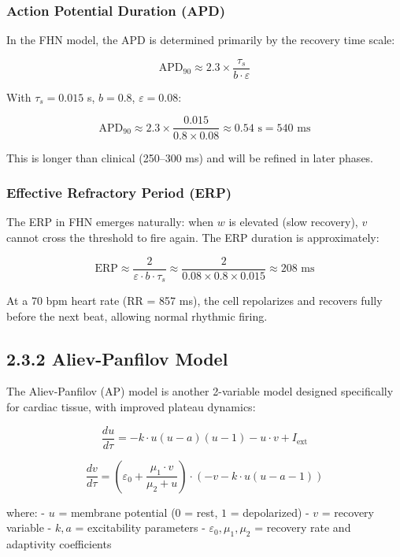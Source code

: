 \documentclass[12pt,oneside,a4paper]{book}
\begin{document}
\subsubsection{Action Potential Duration (APD)}

In the FHN model, the APD is determined primarily by the recovery time scale:

$$\text{APD}_{90} \approx 2.3 \times \frac{\tau_s}{b \cdot \varepsilon}$$

With $\tau_s = 0.015$ s, $b = 0.8$, $\varepsilon = 0.08$:

$$\text{APD}_{90} \approx 2.3 \times \frac{0.015}{0.8 \times 0.08} \approx 0.54 \text{ s} = 540 \text{ ms}$$

This is longer than clinical (250--300 ms) and will be refined in later phases.

\subsubsection{Effective Refractory Period (ERP)}

The ERP in FHN emerges naturally: when $w$ is elevated (slow recovery), $v$ cannot cross the threshold to fire again. The ERP duration is approximately:

$$\text{ERP} \approx \frac{2}{\varepsilon \cdot b \cdot \tau_s} \approx \frac{2}{0.08 \times 0.8 \times 0.015} \approx 208 \text{ ms}$$

At a 70 bpm heart rate (RR = 857 ms), the cell repolarizes and recovers fully before the next beat, allowing normal rhythmic firing.

\subsection{2.3.2 Aliev-Panfilov Model}

The Aliev-Panfilov (AP) model is another 2-variable model designed specifically for cardiac tissue, with improved plateau dynamics:

\begin{equation}
\frac{du}{d\tau} = -k \cdot u(u - a)(u - 1) - u \cdot v + I_{\text{ext}}
\end{equation}

\begin{equation}
\frac{dv}{d\tau} = \left(\varepsilon_0 + \frac{\mu_1 \cdot v}{\mu_2 + u}\right) \cdot (-v - k \cdot u(u - a - 1))
\end{equation}

where:
- $u$ = membrane potential ($0$ = rest, $1$ = depolarized)
- $v$ = recovery variable
- $k, a$ = excitability parameters
- $\varepsilon_0, \mu_1, \mu_2$ = recovery rate and adaptivity coefficients
\end{document}
